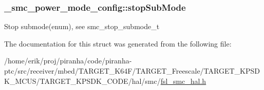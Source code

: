 \subsubsection[{\texorpdfstring{stop\+Sub\+Mode}{stopSubMode}}]{ \+\_\+smc\+\_\+power\+\_\+mode\+\_\+config\+::stop\+Sub\+Mode}\hypertarget{struct__smc__power__mode__config_a8e79865913dbec245cbb398252f4aa35}{}\label{struct__smc__power__mode__config_a8e79865913dbec245cbb398252f4aa35}
Stop submode(enum), see smc\+\_\+stop\+\_\+submode\+\_\+t 

The documentation for this struct was generated from the following file\+:\begin{DoxyCompactItemize}
\item 
/home/erik/proj/piranha/code/piranha-\/ptc/src/receiver/mbed/\+T\+A\+R\+G\+E\+T\+\_\+\+K64\+F/\+T\+A\+R\+G\+E\+T\+\_\+\+Freescale/\+T\+A\+R\+G\+E\+T\+\_\+\+K\+P\+S\+D\+K\+\_\+\+M\+C\+U\+S/\+T\+A\+R\+G\+E\+T\+\_\+\+K\+P\+S\+D\+K\+\_\+\+C\+O\+D\+E/hal/smc/\hyperlink{fsl__smc__hal_8h}{fsl\+\_\+smc\+\_\+hal.\+h}\end{DoxyCompactItemize}
